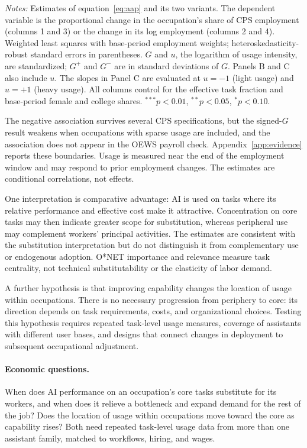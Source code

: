 \documentclass[12pt]{article}
\theoremstyle{plain}
\theoremstyle{definition}
\theoremstyle{remark}
\begin{document}
\begin{table}[tp]
\smallskip
\begin{minipage}{\linewidth}\footnotesize
\emph{Notes:} Estimates of equation~\eqref{eq:aap} and its two variants.
The dependent variable is the proportional change in the occupation's
share of CPS employment (columns 1 and 3) or the change in its log
employment (columns 2 and 4). Weighted least squares with base-period
employment weights; heteroskedasticity-robust standard errors in
parentheses. $G$ and $u$, the logarithm of usage intensity, are
standardized; $G^{+}$ and $G^{-}$ are in standard deviations of $G$.
Panels B and C also include $u$. The slopes in Panel C are evaluated at
$u=-1$ (light usage) and $u=+1$ (heavy usage). All columns control for the
effective task fraction and base-period female and college shares.
$^{***}p<0.01$, $^{**}p<0.05$, $^{*}p<0.10$.
\end{minipage}
\end{table}

The negative association survives several CPS specifications, but
the signed-$G$ result weakens when occupations with sparse usage are
included, and the association does not appear in the OEWS payroll
check. Appendix~\ref{app:evidence} reports these boundaries. Usage is
measured near the end of the employment window and may respond to prior
employment changes. The estimates are conditional correlations, not
effects.

One interpretation is comparative advantage: AI is used on tasks where
its relative performance and effective cost make it attractive. Concentration on core
tasks may then indicate greater scope for substitution, whereas
peripheral use may complement workers' principal activities. The
estimates are consistent with the substitution interpretation but do
not distinguish it from complementary use or endogenous adoption.
O*NET importance and relevance measure task centrality, not technical
substitutability or the elasticity of labor demand.

A further hypothesis is that improving capability changes the location
of usage within occupations. There is no necessary progression from
periphery to core: its direction depends on task requirements, costs,
and organizational choices. Testing this hypothesis requires repeated
task-level usage measures, coverage of assistants with different user
bases, and designs that connect changes in
deployment to subsequent occupational adjustment.

\paragraph{Economic questions.}
When does AI performance on an occupation's core tasks substitute for
its workers, and when does it relieve a bottleneck and expand demand for
the rest of the job? Does the location of usage within occupations move
toward the core as capability rises? Both need repeated task-level usage
data from more than one assistant family, matched to workflows, hiring,
and wages.
\end{document}
